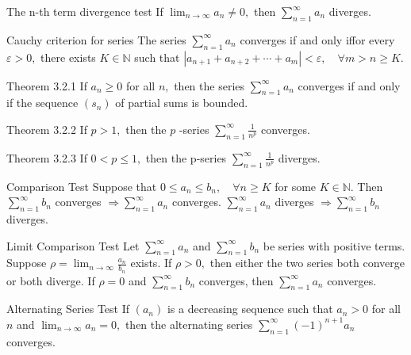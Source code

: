 \documentclass[10pt,landscape]{article}
\theoremstyle{definition}
\newcommand{\thistheoremname}{}
\newtheorem*{genericthm*}{\thistheoremname}
\newenvironment{namedthm*}[1]
{\renewcommand{\thistheoremname}{#1}\begin{genericthm*}}
{\end{genericthm*}}
\begin{document}
\begin{multicols}{3}
	\begin{namedthm*}{The n-th term divergence test}
		If \(\lim _{n \rightarrow \infty} a_{n} \neq 0,\) then \(\sum_{n=1}^{\infty} a_{n}\) diverges.
	\end{namedthm*}

	\begin{namedthm*}{Cauchy criterion for series}
		The series \(\sum_{n=1}^{\infty} a_{n}\) converges if and only iffor every \(\varepsilon>0,\) there exists \(K \in \mathbb{N}\) such that \(\left|a_{n+1}+a_{n+2}+\cdots+a_{m}\right|<\varepsilon, \quad \forall m>n \geq K\).
	\end{namedthm*}

	\begin{namedthm*}{Theorem 3.2.1}
		If \(a_{n} \geq 0\) for all \(n,\) then the series \(\sum_{n=1}^{\infty} a_{n}\) converges if and only if the sequence \(\left(s_{n}\right)\) of partial sums is bounded.
	\end{namedthm*}

	\begin{namedthm*}{Theorem 3.2.2}
		If \(p>1,\) then the \(p\) -series \(\sum_{n=1}^{\infty} \frac{1}{n^{p}}\) converges.
	\end{namedthm*}

	\begin{namedthm*}{Theorem 3.2.3}
		If \(0<p \leq 1,\) then the p-series \(\sum_{n=1}^{\infty} \frac{1}{n^{p}}\) diverges.
	\end{namedthm*}

	\begin{namedthm*}{Comparison Test}
		Suppose that \(0 \leq a_n \leq b_n, \quad \forall n \geq K\) for some \(K \in \mathbb{N}\). Then \(\sum_{n=1}^{\infty} b_{n}\) converges \(\Longrightarrow \sum_{n=1}^{\infty} a_{n}\) converges. \(\sum_{n=1}^{\infty} a_{n}\) diverges \(\Longrightarrow \sum_{n=1}^{\infty} b_{n}\) diverges.
	\end{namedthm*}


	\begin{namedthm*}{Limit Comparison Test}
		Let \(\sum_{n=1}^{\infty} a_{n}\) and \(\sum_{n=1}^{\infty} b_{n}\) be series with positive terms. Suppose \(\rho=\lim _{n \rightarrow \infty} \frac{a_{n}}{b_{n}}\) exists. If \(\rho>0,\) then either the two series both converge or both diverge. If \(\rho=0\) and \(\sum_{n=1}^{\infty} b_{n}\) converges, then \(\sum_{n=1}^{\infty} a_{n}\) converges.
	\end{namedthm*}

	\begin{namedthm*}{Alternating Series Test}
		If \(\left(a_{n}\right)\) is a decreasing sequence such that \(a_{n}>0\) for all \(n\) and \(\lim _{n \rightarrow \infty} a_{n}=0,\) then the alternating series \(\sum_{n=1}^{\infty}(-1)^{n+1} a_{n}\) converges.
	\end{namedthm*}


\end{multicols}
\end{document}
